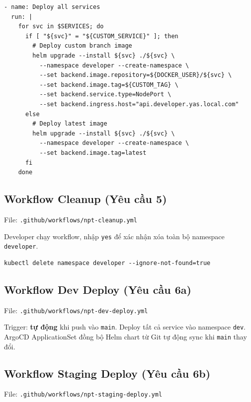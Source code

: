 \begin{lstlisting}[style=yamlstyle, caption=Developer build — deploy service với custom image (trích)]
- name: Deploy all services
  run: |
    for svc in $SERVICES; do
      if [ "${svc}" = "${CUSTOM_SERVICE}" ]; then
        # Deploy custom branch image
        helm upgrade --install ${svc} ./${svc} \
          --namespace developer --create-namespace \
          --set backend.image.repository=${DOCKER_USER}/${svc} \
          --set backend.image.tag=${CUSTOM_TAG} \
          --set backend.service.type=NodePort \
          --set backend.ingress.host="api.developer.yas.local.com"
      else
        # Deploy latest image
        helm upgrade --install ${svc} ./${svc} \
          --namespace developer --create-namespace \
          --set backend.image.tag=latest
      fi
    done
\end{lstlisting}

\subsection{Workflow Cleanup (Yêu cầu 5)}

File: \texttt{.github/workflows/npt-cleanup.yml}

Developer chạy workflow, nhập \texttt{yes} để xác nhận \textrightarrow{} xóa toàn bộ namespace \texttt{developer}.

\begin{lstlisting}[style=bashstyle, caption=Cleanup deployment]
kubectl delete namespace developer --ignore-not-found=true
\end{lstlisting}

\subsection{Workflow Dev Deploy (Yêu cầu 6a)}

File: \texttt{.github/workflows/npt-dev-deploy.yml}

Trigger: \textbf{tự động} khi push vào \texttt{main}. Deploy tất cả service vào namespace \texttt{dev}.
ArgoCD ApplicationSet đồng bộ Helm chart từ Git \textrightarrow{} tự động sync khi \texttt{main} thay đổi.

\subsection{Workflow Staging Deploy (Yêu cầu 6b)}

File: \texttt{.github/workflows/npt-staging-deploy.yml}

